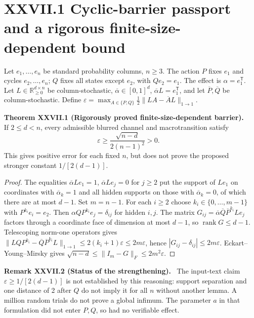\documentclass[11pt,a4paper,oneside]{book}
\newcommand{\R}{\mathbb R}\newcommand{\C}{\mathbb C}\newcommand{\Z}{\mathbb Z}\newcommand{\N}{\mathbb N}\newcommand{\Q}{\mathbb Q}
\DeclareMathOperator{\rank}{rank}\DeclareMathOperator{\Tr}{Tr}
\newcommand{\statement}[3]{\par\medskip\noindent\textbf{#1 #2 (#3).}\ }
\begin{document}
\section*{XXVII.1 Cyclic-barrier passport and a rigorous finite-size-dependent bound}
Let $e_1,\ldots,e_n$ be standard probability columns, $n\ge3$. The action $P$ fixes $e_1$ and cycles $e_2,\ldots,e_n$; $Q$ fixes all states except $e_2$, with $Qe_2=e_1$. The effect is $\alpha=e_1^{\mathsf T}$. Let $L\in\R_{\ge0}^{d\times n}$ be column-stochastic, $\overline\alpha\in[0,1]^d$, $\overline\alpha L=e_1^{\mathsf T}$, and let $\overline P,\overline Q$ be column-stochastic. Define $\varepsilon=\max_{A\in\{P,Q\}}\frac12\|LA-\overline AL\|_{1\to1}$.
\statement{Theorem}{XXVII.1}{Rigorously proved finite-size-dependent barrier} If $2\le d<n$, every admissible blurred channel and macrotransition satisfy
\begin{equation}\varepsilon\ge\frac{\sqrt{n-d}}{2(n-1)^2}>0.\tag{107}\end{equation}
This gives positive error for each fixed $n$, but does not prove the proposed stronger constant $1/[2(d-1)]$.
\begin{proof}The equalities $\overline\alpha Le_1=1$, $\overline\alpha Le_j=0$ for $j\ge2$ put the support of $Le_1$ on coordinates with $\overline\alpha_k=1$ and all hidden supports on those with $\overline\alpha_k=0$, of which there are at most $d-1$. Set $m=n-1$. For each $i\ge2$ choose $k_i\in\{0,\ldots,m-1\}$ with $P^{k_i}e_i=e_2$. Then $\alpha QP^{k_i}e_j=\delta_{ij}$ for hidden $i,j$. The matrix $G_{ij}=\overline\alpha\overline Q\overline P^{k_i}Le_j$ factors through a coordinate face of dimension at most $d-1$, so $\rank G\le d-1$. Telescoping norm-one operators gives $\|LQP^{k_i}-\overline Q\overline P^{k_i}L\|_{1\to1}\le2(k_i+1)\varepsilon\le2m\varepsilon$, hence $|G_{ij}-\delta_{ij}|\le2m\varepsilon$. Eckart--Young--Mirsky gives $\sqrt{n-d}\le\|I_m-G\|_F\le2m^2\varepsilon$.\end{proof}
\statement{Remark}{XXVII.2}{Status of the strengthening} The input-text claim $\varepsilon\ge1/[2(d-1)]$ is not established by this reasoning: support separation and one distance of 2 after $Q$ do not imply it for all $n$ without another lemma. A million random trials do not prove a global infimum. The parameter $a$ in that formulation did not enter $P,Q$, so had no verifiable effect.
\end{document}
